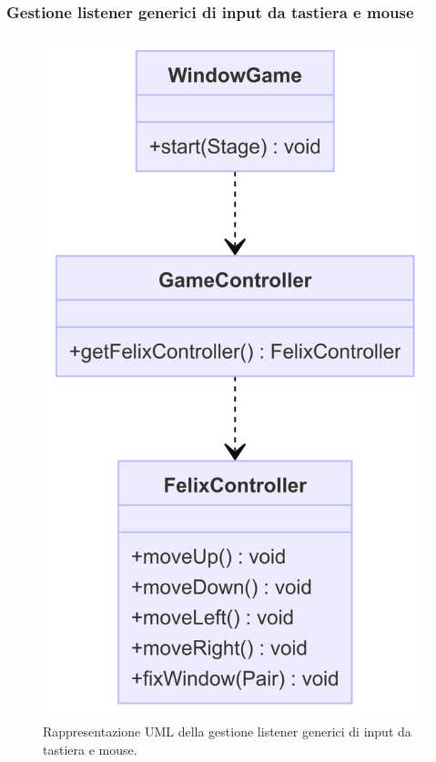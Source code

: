 \subsubsection{Gestione listener generici di input da tastiera e mouse}

\begin{figure}[H]
\centering{}
\includegraphics[width=\textwidth]{img/input.png}
\caption{Rappresentazione UML della gestione listener generici di input da tastiera e mouse.}
\end{figure}

